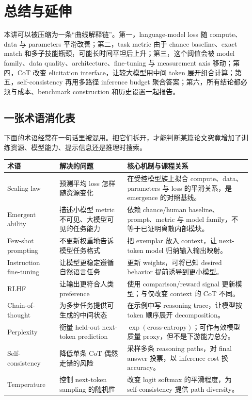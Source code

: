 \section{总结与延伸}

本讲可以被压缩为一条“曲线解释链”。第一，language-model loss 随 compute、data 与 parameters 平滑改善；第二，task metric 由于 chance baseline、exact match 和多子技能瓶颈，可能长时间平坦后上升；第三，这个阈值会被 model family、data quality、architecture、fine-tuning 与 measurement axis 移动；第四，CoT 改变 elicitation interface，让较大模型用中间 token 展开组合计算；第五，self-consistency 再用多路径 inference budget 聚合答案；第六，所有结论都必须与成本、benchmark construction 和历史设置一起报告。

\subsection{一张术语消化表}

下面的术语经常在一句话里被混用。把它们拆开，才能判断某篇论文究竟增加了训练资源、模型能力、提示信息还是推理时搜索。

\begin{longtable}{L{0.19\textwidth}L{0.32\textwidth}L{0.40\textwidth}}
\toprule
\textbf{术语} & \textbf{解决的问题} & \textbf{核心机制与课程关系} \\
\midrule
\endhead
Scaling law & 预测平均 loss 怎样随资源变化 & 在受控模型族上拟合 compute、data、parameters 与 loss 的平滑关系，是 emergence 的对照基线。 \\
Emergent ability & 描述小模型 metric 不可见、大模型可见的任务能力 & 依赖 chance/human baseline、prompt、metric 与 model family，不等于已证明离散内部模块。 \\
Few-shot prompting & 不更新权重地告诉模型任务格式 & 把 exemplar 放入 context，让 next-token model 归纳输入输出映射。 \\
Instruction fine-tuning & 让模型更稳定遵循自然语言任务 & 更新 weights，可将已知 desired behavior 提前诱导到更小模型。 \\
RLHF & 让输出更符合人类 preference & 使用 comparison/reward signal 更新模型；与仅改变 context 的 CoT 不同。 \\
Chain-of-thought & 为多步任务提供可生成的中间状态 & 在示例中写 reasoning trace，让模型按 token 顺序展开 decomposition。 \\
Perplexity & 衡量 held-out next-token prediction & $\exp(\text{cross-entropy})$；可作有效模型质量 proxy，但不是下游能力总分。 \\
Self-consistency & 降低单条 CoT 偶然走错的风险 & 采样多条 reasoning paths，对 final answer 投票，以 inference cost 换 accuracy。 \\
Temperature & 控制 next-token sampling 的随机性 & 改变 logit softmax 的平滑程度，为 self-consistency 提供 path diversity。 \\
\bottomrule
\end{longtable}


